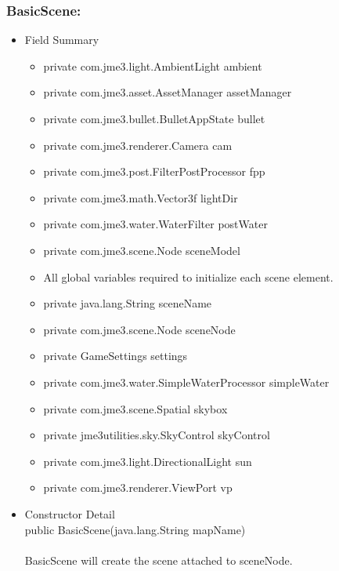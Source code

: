 \documentclass[letterpaper]{article}
\begin{document}
						\subsubsection*{BasicScene:}
						\vspace{0.1in}
							\begin{itemize}
								\item	Field Summary
										\begin{itemize}
											\item	private com.jme3.light.AmbientLight	ambient 
											\item	private com.jme3.asset.AssetManager	assetManager 
											\item	private com.jme3.bullet.BulletAppState	bullet 
											\item	private com.jme3.renderer.Camera	cam 
											\item	private com.jme3.post.FilterPostProcessor	fpp 
											\item	private com.jme3.math.Vector3f	lightDir 
											\item	private com.jme3.water.WaterFilter	postWater 
											\item	private com.jme3.scene.Node	sceneModel
											\item	All global variables required to initialize each scene element.
											\item	private java.lang.String	sceneName 
											\item	private com.jme3.scene.Node	sceneNode 
											\item	private GameSettings	settings 
											\item	private com.jme3.water.SimpleWaterProcessor	simpleWater 
											\item	private com.jme3.scene.Spatial	skybox 
											\item	private jme3utilities.sky.SkyControl	skyControl 
											\item	private com.jme3.light.DirectionalLight	sun 
											\item	private com.jme3.renderer.ViewPort	vp 
										\end{itemize}
								\item	Constructor Detail \\
										public BasicScene(java.lang.String mapName) \\ \\
										BasicScene will create the scene attached to sceneNode. \\ \\

\end{itemize}
\end{document}
